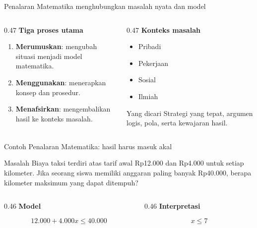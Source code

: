 \begin{frame}[shrink=1]{Penalaran Matematika menghubungkan masalah nyata dan model}
  \begin{columns}[T,onlytextwidth]
    \begin{column}{0.47\textwidth}
      {\color{StudentBlue}\bfseries Tiga proses utama}\par
      \begin{enumerate}
        \item \textbf{Merumuskan}: mengubah situasi menjadi model matematika.
        \item \textbf{Menggunakan}: menerapkan konsep dan prosedur.
        \item \textbf{Menafsirkan}: mengembalikan hasil ke konteks masalah.
      \end{enumerate}
    \end{column}
    \begin{column}{0.47\textwidth}
      {\color{StudentBlue}\bfseries Konteks masalah}\par
      \begin{itemize}
        \item Pribadi
        \item Pekerjaan
        \item Sosial
        \item Ilmiah
      \end{itemize}
      \begin{block}{Yang dicari}
        Strategi yang tepat, argumen logis, pola, serta kewajaran hasil.
      \end{block}
    \end{column}
  \end{columns}
\end{frame}

\begin{frame}{Contoh Penalaran Matematika: hasil harus masuk akal}
  \begin{block}{Masalah}
    Biaya taksi terdiri atas tarif awal Rp12.000 dan Rp4.000 untuk setiap kilometer. Jika seorang siswa memiliki anggaran paling banyak Rp40.000, berapa kilometer maksimum yang dapat ditempuh?
  \end{block}
  \vspace{0.15cm}
  \begin{columns}[T,onlytextwidth]
    \begin{column}{0.46\textwidth}
      {\color{StudentBlue}\bfseries Model}\par
      \[
        12.000 + 4.000x \leq 40.000
      \]
    \end{column}
    \begin{column}{0.46\textwidth}
      {\color{StudentBlue}\bfseries Interpretasi}\par
      \[
        x \leq 7
      \]
    \end{column}
  \end{columns}
\end{frame}

